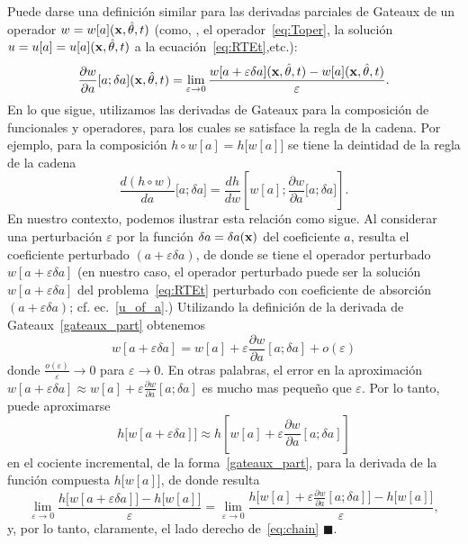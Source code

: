Puede darse una definición similar para las derivadas parciales de Gateaux 
de un operador $w = w[a](\mathbf{x},\hat{\theta},t)$ (como, \eg, el operador~\eqref{eq:Toper}, 
la solución $u = u[a]=u[a](\mathbf{x},\hat{\theta},t)$ a la ecuación~\eqref{eq:RTEt},etc.):
\begin{equation}\label{gateaux_part}
  \frac{\partial w}{\partial a}[a; \delta a ](\mathbf{x},\hat{\theta},t) = \lim_{\varepsilon \to 0} \frac{w[a +\varepsilon \delta a](\mathbf{x},\hat{\theta},t)
    - w[a](\mathbf{x},\hat{\theta},t)}{\varepsilon}.
\end{equation}
En lo que sigue, utilizamos las derivadas de Gateaux para la composición 
de funcionales y operadores, para los cuales se satisface la regla de la cadena. 
Por ejemplo, para la composición  $h\circ w [a] = h\big[w[a]\big]$ 
se tiene la deintidad de la regla de la cadena
\begin{equation}\label{eq:chain}
  \frac{d (h\circ w)}{da} \big[a;\delta a\big]= \frac{d h}{
    d w}\left[w[a];\frac{\partial w}{\partial a} \big[a;\delta
    a\big]\right].
\end{equation}
En nuestro contexto, podemos ilustrar esta relación como sigue. 
Al considerar una perturbación $\varepsilon$ por la función $\delta a = \delta a(\mathbf{x})$ 
del coeficiente $a$, resulta el coeficiente perturbado $(a+\varepsilon\delta a)$, 
de donde se tiene el operador perturbado $w[a+\varepsilon\delta a]$ (en nuestro caso, 
el operador perturbado puede ser \eg la solución $w[a+\varepsilon\delta a]$ del problema~\eqref{eq:RTEt} perturbado con coeficiente de absorción $(a+\varepsilon\delta a)$; 
cf. ec.~\eqref{u_of_a}.) Utilizando la definición de la derivada 
de Gateaux~\eqref{gateaux_part} obtenemos
\[
  w[a+\varepsilon\delta a] = w[a]+\varepsilon \frac{\partial
    w}{\partial a}[a; \delta a ] + o(\varepsilon)
\]
donde $\frac{o(\varepsilon)}{\varepsilon}\to 0$ para $\varepsilon\to 0$. 
En otras palabras, el error en la aproximación $w[a+\varepsilon\delta a] \approx w[a]+\varepsilon \frac{\partial
  w}{\partial a}[a; \delta a ]$ es mucho mas pequeño que $\varepsilon$. 
Por lo tanto, puede aproximarse   
\[
  h\big[w[a+\varepsilon\delta a]\big] \approx h\left[w[a]+\varepsilon \frac{\partial
    w}{\partial a}[a; \delta a ]\right]
\]
en el cociente incremental, de la forma~\eqref{gateaux_part}, 
para la derivada de la función compuesta $h\big[w[a]\big]$, 
de donde resulta 
\[
 \lim_{\varepsilon\to 0}\frac{h\big[w[a+\varepsilon\delta a]\big]
     -h\big[w[a]\big]}{\varepsilon}  = \lim_{\varepsilon\to
    0} \frac{h\big[w[a]+\varepsilon \frac{\partial w}{\partial a}[a;
    \delta a ]\big]-h\big[w[a]\big]}{\varepsilon},
\]
y, por lo tanto, claramente, el lado derecho de~\eqref{eq:chain} $\blacksquare$.

